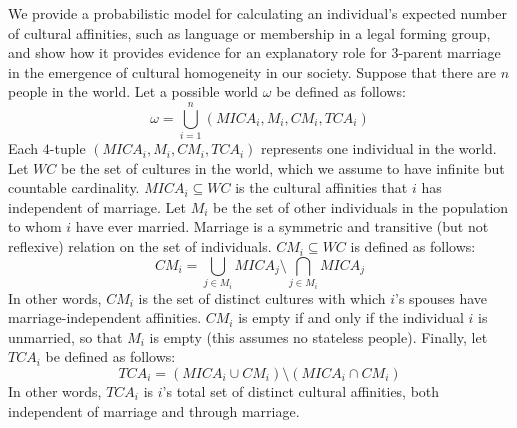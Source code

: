 
We provide a probabilistic model for calculating an individual's expected number of cultural affinities, such as language or membership in a legal forming group, and show how it provides evidence for an explanatory role for $3$-parent marriage in the emergence of cultural homogeneity in our society. Suppose that there are $n$ people in the world. Let a possible world $\omega$ be defined as follows:
\begin{equation}
    \omega = \bigcup_{i=1}^{n}(MICA_{i}, M_{i}, CM_{i}, TCA_{i})
\end{equation}
Each $4$-tuple $(MICA_{i}, M_{i}, CM_{i}, TCA_{i})$ represents one individual in the world. Let $WC$ be the set of cultures in the world, which we assume to have infinite but countable cardinality. $MICA_{i}\subseteq WC$ is the cultural affinities that $i$ has independent of marriage. Let $M_{i}$ be the set of other individuals in the population to whom $i$ have ever married. Marriage is a symmetric and transitive (but not reflexive) relation on the set of individuals. $CM_{i}\subseteq WC$ is defined as follows:
\begin{equation}
    CM_{i}=\bigcup_{j\in M_{i}}MICA_{j}\setminus\bigcap_{j\in M_{i}}MICA_{j}
\end{equation}
In other words, $CM_{i}$ is the set of distinct cultures with which $i$'s spouses have marriage-independent affinities. $CM_{i}$ is empty if and only if the individual $i$ is unmarried, so that $M_{i}$ is empty (this assumes no stateless people). Finally, let $TCA_{i}$ be defined as follows:
\begin{equation}
    TCA_{i}=(MICA_{i}\cup CM_{i})\setminus (MICA_{i}\cap CM_{i})
\end{equation}
In other words, $TCA_{i}$ is $i$'s total set of distinct cultural affinities, both independent of marriage and through marriage.\par 

